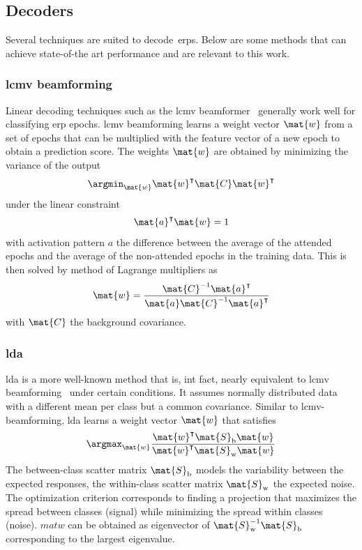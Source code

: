 \subsection{Decoders}
Several techniques are suited to decode~\acp{erp}.
Below are some methods that can achieve state-of-the art performance and are
relevant to this work.

\subsubsection{\Acf{lcmv} beamforming}
Linear decoding techniques such as the \ac{lcmv}
beamformer~\cite{Wittevrongel2016} generally work well for
classifying \ac{erp} epochs.
\Ac{lcmv} beamforming learns a weight vector $\mat{w}$ from a set of epochs that can
be multiplied with the feature vector of a new epoch to obtain a prediction
score.
The weights $\mat{w}$ are obtained by minimizing the variance of the output
\begin{equation}
  \argmin_\mat{w}\mat{w}^\intercal\mat{C}
	\mat{w}^\intercal
\end{equation}
under the linear constraint
\begin{equation}
	\mat{a}^\intercal\mat{w} = 1
\end{equation}
with activation pattern $a$ the difference between the average of the attended epochs and the
average of the non-attended epochs in the training data.
This is then solved by  method of Lagrange multipliers as
\begin{equation}
	\mat{w} =
  \frac{\mat{C}^{-1}\mat{a}^\intercal}
  {\mat{a}\mat{C}^{-1}\mat{a}^\intercal}
\end{equation}
with $\mat{C}$ the background covariance.

\subsubsection{\Acf{lda}}
\Ac{lda} is a more well-known method that is, int fact, nearly equivalent to
\ac{lcmv} beamforming~\cite{Treder2016} under certain conditions.
It assumes normally distributed data with a different mean per class but a
common covariance.
Similar to \ac{lcmv}-beamforming, \ac{lda} learns a weight vector $\mat{w}$
that satisfies
\begin{equation}
  \argmax_\mat{w}\frac{\mat{w}^\intercal\mat{S}_\text{b}\mat{w}}{\mat{w}^\intercal\mat{S}_\text{w}\mat{w}}
\end{equation}
The between-class scatter matrix $\mat{S}_\text{b}$ models the variability
between the expected responses, the within-class scatter matrix
$\mat{S}_\text{w}$ the expected noise.
The optimization criterion corresponds to finding a projection that maximizes
the spread between classes (signal) while minimizing the spread within classes
(noise).
$mat{w}$ can be obtained as eigenvector of
$\mat{S}_\text{w}^{-1}\mat{S}_\text{b}$ corresponding to the largest eigenvalue.

